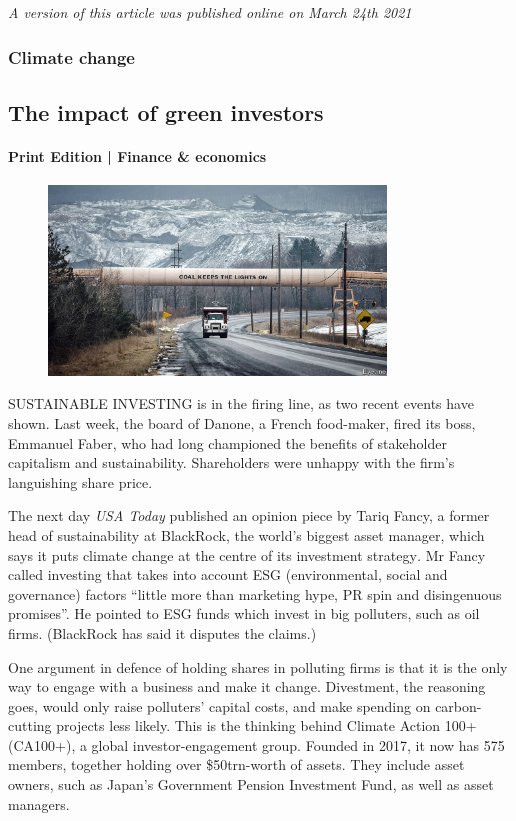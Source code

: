 \documentclass{article}
\begin{document}
\emph{A version of this article was published online on March 24th 2021} 
\clearpage
\subsubsection{Climate change }
\subsection{The impact of green investors }
\paragraph{Print Edition | Finance \& economics  \quad \color{gray}{Mar 27th 2021 }}
\begin{figure}[h]
\centering
\includegraphics[width=0.8\textwidth]{images/20210327_FNP001_0.jpg}
\end{figure}
\lettrine{S}USTAINABLE INVESTING is in the firing line, as two recent events have shown. Last week, the board of Danone, a French food-maker, fired its boss, Emmanuel Faber, who had long championed the benefits of stakeholder capitalism and sustainability. Shareholders were unhappy with the firm's languishing share price. 

The next day \emph{USA Today} published an opinion piece by Tariq Fancy, a former head of sustainability at BlackRock, the world's biggest asset manager, which says it puts climate change at the centre of its investment strategy\emph{.} Mr Fancy called investing that takes into account ESG (environmental, social and governance) factors ``little more than marketing hype, PR spin and disingenuous promises''. He pointed to ESG funds which invest in big polluters, such as oil firms. (BlackRock has said it disputes the claims.) 

One argument in defence of holding shares in polluting firms is that it is the only way to engage with a business and make it change. Divestment, the reasoning goes, would only raise polluters' capital costs, and make spending on carbon-cutting projects less likely. This is the thinking behind Climate Action 100+ (CA100+), a global investor-engagement group. Founded in 2017, it now has 575 members, together holding over \$50trn-worth of assets. They include asset owners, such as Japan's Government Pension Investment Fund, as well as asset managers. 
\end{document}
